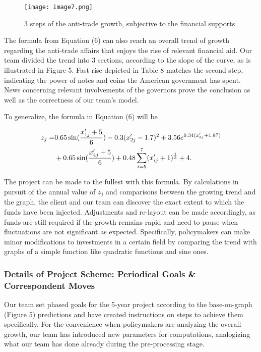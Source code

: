 \documentclass[12pt]{article}
\begin{document}
\begin{wrapfigure}{r}{0.29\textwidth}
\texttt{[image: image7.png]}
\caption{3 steps of the anti-trade growth, subjective to the financial supports}
\end{wrapfigure}

The formula from Equation (6) can also reach an overall trend of growth regarding the anti-trade affairs that enjoys the rise of relevant financial aid. Our team divided the trend into 3 sections, according to the slope of the curve, as is illustrated in Figure 5. Fast rise depicted in Table 8 matches the second step, indicating the power of notes and coins the American government has spent. News concerning relevant involvements of the governors prove the conclusion as well as the correctness of our team's model.

To generalize, the formula in Equation (6) will be

\begin{equation}
	\begin{aligned}
		z_{j} = &0.65 \sin(\frac{x'_{1j}+5}{6})-0.3(x'_{2j}-1.7)^2+3.56e^{0.34(x'_{3j}+1.87)}\\
		&+0.65\sin (\frac{x'_{4j}+5}{6})+0.48\sum_{i=5}^7(x'_{ij}+1)^{\frac{1}{3}}+4.
	\end{aligned}
	\setcounter{equation}{6}
\end{equation}

The project can be made to the fullest with this formula. By calculations in pursuit of the annual value of $z_j$ and comparisons between the growing trend and the graph, the client and our team can discover the exact extent to which the funds have been injected. Adjustments and re-layout can be made accordingly, as funds are still required if the growth remains rapid and need to pause when fluctuations are not significant as expected. Specifically, policymakers can make minor modifications to investments in a certain field by comparing the trend with graphs of a simple function like quadratic functions and sine ones.

\subsubsection{Details of Project Scheme: Periodical Goals \& Correspondent Moves}

Our team set phased goals for the 5-year project according to the base-on-graph (Figure 5) predictions and have created instructions on steps to achieve them specifically. For the convenience when policymakers are analyzing the overall growth, our team has introduced new parameters for computations, analogizing what our team has done already during the pre-processing stage.
\end{document}
